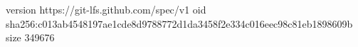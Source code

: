 version https://git-lfs.github.com/spec/v1
oid sha256:c013ab4548197ae1cde8d9788772d1da3458f2e334c016eec98c81eb1898609b
size 349676

